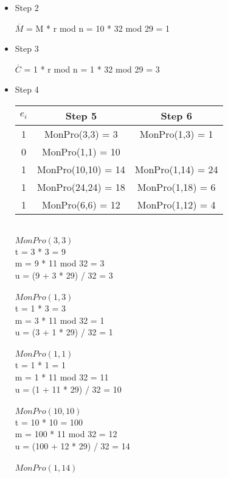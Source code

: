 \documentclass[11pt, pdftex]{article}
\begin{document}
\begin{itemize}
\item Step 2
\begin{description}
$\overline{M}$ = M * r mod n = 10 * 32 mod 29 = 1
\end{description}
\item Step 3
\begin{description}
$\overline{C}$ = 1 * r mod n = 1 * 32 mod 29 = 3
\end{description}
\item Step 4
\begin{description}
\begin{center}
\begin{tabular}{c|c|c} 
$e_{i}$ & Step 5 & Step 6\\
\hline
1 & MonPro(3,3) = 3 & MonPro(1,3) = 1 \\
\hline
0 & MonPro(1,1) = 10 &  \\
\hline
1 & MonPro(10,10) = 14 & MonPro(1,14) = 24\\
\hline
1 & MonPro(24,24) = 18 & MonPro(1,18) = 6\\
\hline
1 & MonPro(6,6) = 12 & MonPro(1,12) =  4 \\
\end{tabular}
\end{center}
\\
$MonPro(3,3)$\\
t = 3 * 3 = 9\\
m = 9 * 11 mod 32 = 3\\
u = (9 + 3 * 29) / 32 = 3\\
\\
$MonPro(1,3)$\\
t = 1 * 3 = 3\\
m = 3 * 11 mod 32 = 1\\
u = (3 + 1 * 29) / 32 = 1\\
\\
$MonPro(1,1)$\\
t = 1 * 1 = 1\\
m = 1 * 11 mod 32 = 11\\
u = (1 + 11 * 29) / 32 = 10\\
\\
$MonPro(10,10)$\\
t = 10 * 10 = 100\\
m = 100 * 11 mod 32 = 12\\
u = (100 + 12 * 29) / 32 = 14\\
\\
$MonPro(1,14)$\\

\end{description}
\end{itemize}
\end{document}
